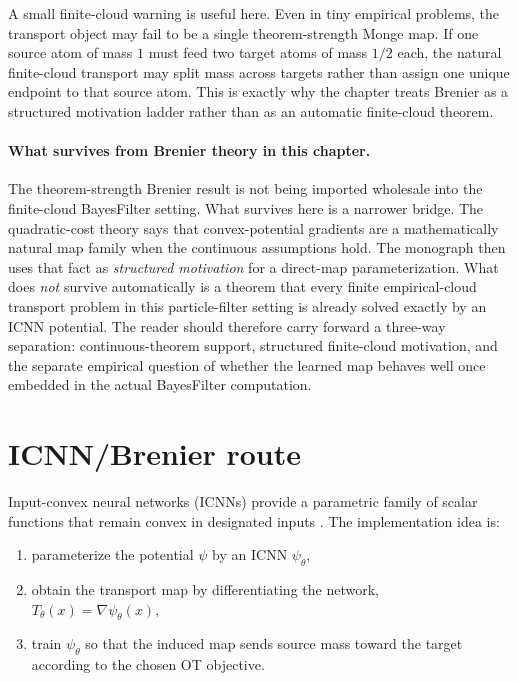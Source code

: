 A small finite-cloud warning is useful here.  Even in tiny empirical problems, the
transport object may fail to be a single theorem-strength Monge map.  If one source
atom of mass \(1\) must feed two target atoms of mass \(1/2\) each, the natural
finite-cloud transport may split mass across targets rather than assign one unique
endpoint to that source atom.  This is exactly why the chapter treats Brenier as a
structured motivation ladder rather than as an automatic finite-cloud theorem.

\paragraph{What survives from Brenier theory in this chapter.}
The theorem-strength Brenier result is not being imported wholesale into the
finite-cloud BayesFilter setting.  What survives here is a narrower bridge.  The
quadratic-cost theory says that convex-potential gradients are a mathematically
natural map family when the continuous assumptions hold.  The monograph then uses
that fact as \emph{structured motivation} for a direct-map parameterization.  What
does \emph{not} survive automatically is a theorem that every finite empirical-cloud
transport problem in this particle-filter setting is already solved exactly by an
ICNN potential.  The reader should therefore carry forward a three-way separation:
continuous-theorem support, structured finite-cloud motivation, and the separate
empirical question of whether the learned map behaves well once embedded in the
actual BayesFilter computation.

\section{ICNN/Brenier route}
\label{sec:bf-neural-ot-direct-icnn}

Input-convex neural networks (ICNNs) provide a parametric family of scalar
functions that remain convex in designated inputs \citep{amos2017icnn,makkuva2020otmapping}.  The implementation idea is:
\begin{enumerate}[label=(\roman*)]
  \item parameterize the potential \(\psi\) by an ICNN \(\psi_\theta\),
  \item obtain the transport map by differentiating the network,
  \(
    T_\theta(x)=\nabla\psi_\theta(x),
  \)
  \item train \(\psi_\theta\) so that the induced map sends source mass toward
  the target according to the chosen OT objective.
\end{enumerate}

